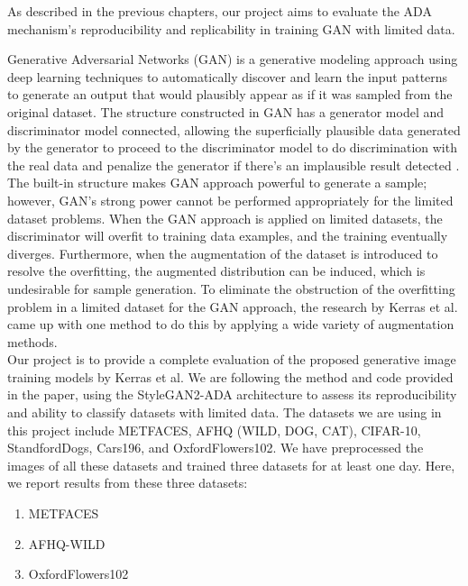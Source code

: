 \documentclass{report}
\begin{document}

As described in the previous chapters, our project aims to evaluate the ADA mechanism's reproducibility and replicability in training GAN with limited data. 

Generative Adversarial Networks (GAN) is a generative modeling approach using deep learning techniques to automatically discover and learn the input patterns to generate an output that would plausibly appear as if it was sampled from the original dataset\cite{goodfellow2014generative}. The structure constructed in GAN has a generator model and discriminator model connected, allowing the superficially plausible data generated by the generator to proceed to the discriminator model to do discrimination with the real data and penalize the generator if there’s an implausible result detected \cite{creswell2018generative}. The built-in structure makes GAN approach powerful to generate a sample; however, GAN's strong power cannot be performed appropriately for the limited dataset problems. When the GAN approach is applied on limited datasets, the discriminator will overfit to training data examples, and the training eventually diverges. Furthermore, when the augmentation of the dataset is introduced to resolve the overfitting, the augmented distribution can be induced, which is undesirable for sample generation\cite{zhao2020improved}. To eliminate the obstruction of the overfitting problem in a limited dataset for the GAN approach, the research by Kerras et al. came up with one method to do this by applying a wide variety of augmentation methods\cite{karras2020training}. \\
Our project is to provide a complete evaluation of the proposed generative image training models by Kerras et al. We are following the method and code provided in the paper, using the StyleGAN2-ADA architecture to assess its reproducibility and ability to classify datasets with limited data. The datasets we are using in this project include METFACES\cite{karras2020training}, AFHQ (WILD, DOG, CAT)\cite{choi2020stargan}, CIFAR-10\cite{krizhevsky2009learning}, StandfordDogs\cite{KhoslaYaoJayadevaprakashFeiFei_FGVC2011, imagenet_cvpr09}, Cars196\cite{KrauseStarkDengFei-Fei_3DRR2013}, and OxfordFlowers102\cite{Nilsback08}. We have preprocessed the images of all these datasets and trained three datasets for at least one day. Here, we report results from these three datasets:
\begin{enumerate}
\item METFACES
\item AFHQ-WILD
\item OxfordFlowers102
\end{enumerate}
\end{document}
